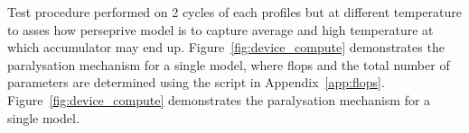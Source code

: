 %
Test procedure performed on 2 cycles of each profiles but at different temperature to asses how perseprive model is to capture average and high temperature at which accumulator may end up.
%
%
{
\mbox{Figure~\ref{fig:device_compute}} demonstrates the paralysation mechanism for a single model, where flops and the total number of parameters are determined using the script in Appendix~\ref{app:flops}.
}
{
\mbox{Figure~\ref{fig:device_compute}} demonstrates the paralysation mechanism for a single model.%
}
